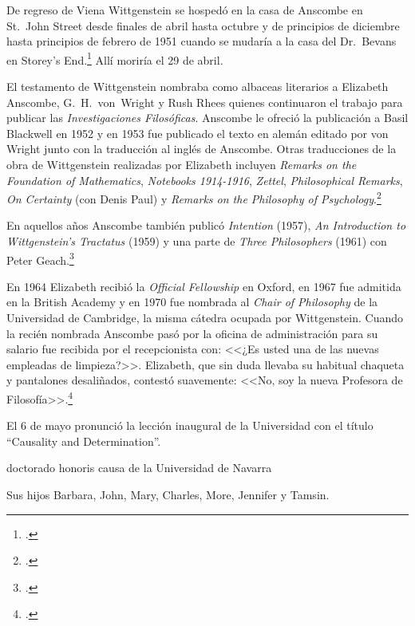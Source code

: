     De regreso de Viena Wittgenstein se hospedó en la casa de Anscombe en St.~John
    Street desde finales de abril hasta octubre y de principios de diciembre hasta
    principios de febrero de 1951 cuando se mudaría a la casa del Dr.~Bevans en
    Storey's End.\footcite[cf.~][loc. 11242]{monk} Allí moriría el 29 de abril.

    El testamento de Wittgenstein nombraba como albaceas literarios a Elizabeth
    Anscombe, G.~H.~von~Wright y Rush Rhees quienes continuaron el trabajo para
    publicar las \emph{Investigaciones Filosóficas}. Anscombe le ofreció la
    publicación a Basil Blackwell en 1952 y en 1953 fue publicado el texto en
    alemán editado por von Wright junto con la traducción al inglés de Anscombe.
    Otras traducciones de la obra de Wittgenstein realizadas por Elizabeth
    incluyen \emph{Remarks on the Foundation of Mathematics}, \emph{Notebooks
      1914-1916}, \emph{Zettel}, \emph{Philosophical Remarks}, \emph{On Certainty}
    (con Denis Paul) y \emph{Remarks on the Philosophy of
      Psychology}.\footcite[cfr.~][p.~38]{biofellows}


    En aquellos años Anscombe también publicó \emph{Intention} (1957), \emph{An
      Introduction to Wittgenstein's Tractatus} (1959) y una parte de \emph{Three
      Philosophers} (1961) con Peter Geach.\footcite[cfr.~][p.~39]{biofellows}

    En 1964 Elizabeth recibió la \emph{Official Fellowship} en Oxford, en 1967 fue
    admitida en la British Academy y en 1970 fue nombrada al \emph{Chair of
      Philosophy} de la Universidad de Cambridge, la misma cátedra ocupada por
    Wittgenstein. Cuando la recién nombrada Anscombe pasó por la oficina de
    administración para su salario fue recibida por el recepcionista con: <<¿Es
    usted una de las nuevas empleadas de limpieza?>>. Elizabeth, que sin duda
    llevaba su habitual chaqueta y pantalones desaliñados, contestó suavemente:
    <<No, soy la nueva Profesora de
    Filosofía>>.\footcite[cfr.~][p.~37]{biofellows}

    El 6 de mayo pronunció la lección inaugural de la Universidad con el título
    ``Causality and Determination''.

  doctorado honoris causa de la Universidad de Navarra

    Sus hijos Barbara, John, Mary, Charles, More, Jennifer y Tamsin.
